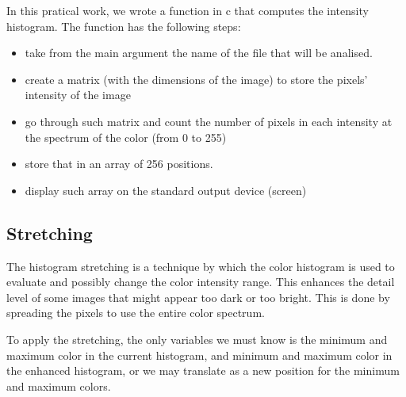 \documentclass{report}
\begin{document}
	In this pratical work, we wrote a function in c that computes the intensity histogram. The function has the following steps:
	\begin{itemize}
  		\item take from the main argument the name of the file that will be analised.
  		\item create a matrix (with the dimensions of the image) to store the pixels' intensity of the image
  		\item go through such matrix and count the number of pixels in each intensity at the spectrum of the color (from 0 to 255)
  		\item store that in an array of 256 positions.
  		\item display such array on the standard output device (screen)
	\end{itemize}

	\subsection{Stretching}

	The histogram stretching is a technique by which the color histogram is used to evaluate and possibly change the color intensity range. This enhances the 		detail level of some images that might appear too dark or too bright. This is done by spreading the pixels to use the entire color spectrum.
	
	To apply the stretching, the only variables we must know is the minimum and maximum color in the current histogram, and minimum and maximum color in the 		enhanced histogram, or we may translate as a new position for the minimum and maximum colors. 
\end{document}
